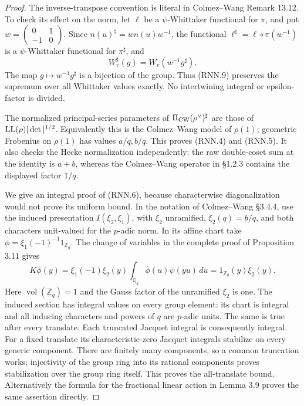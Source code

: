\begin{proof}
The inverse-transpose convention is literal in Colmez--Wang
Remark 13.12.  To check its effect on the norm, let \(\ell\) be a
\(\psi\)-Whittaker functional for \(\pi\), and put
\(w=\left(\begin{smallmatrix}0&1\\-1&0\end{smallmatrix}\right)\).
Since \(n(u)^\sharp=wn(u)w^{-1}\), the functional
\(\ell^\sharp=\ell\circ\pi(w^{-1})\) is a
\(\psi\)-Whittaker functional for \(\pi^\sharp\), and
\[
 W_v^\sharp(g)=W_v(w^{-1}g^\sharp).
 \tag{RNN.9}
\]
The map \(g\mapsto w^{-1}g^\sharp\) is a bijection of the group.
Thus (RNN.9) preserves the supremum over all Whittaker values
exactly.  No intertwining integral or epsilon-factor is divided.

The normalized principal-series parameters of
\(\Pi_{\rm CW}(\rho^\vee)^\sharp\) are those of
\({\rm LL}(\rho)|\det|^{1/2}\).  Equivalently this is the
Colmez--Wang model of \(\rho(1)\); geometric Frobenius on
\(\rho(1)\) has values \(a/q,b/q\).  This proves (RNN.4) and (RNN.5).
It also checks the Hecke normalization independently: the raw
double-coset sum at the identity is \(a+b\), whereas the
Colmez--Wang operator in \S1.2.3 contains the displayed factor
\(1/q\).

We give an integral proof of (RNN.6), because characterwise
diagonalization would not prove its uniform bound.
In the notation of Colmez--Wang \S3.4.4, use the induced
presentation \(I(\xi_2,\xi_1)\), with \(\xi_2\) unramified,
\(\xi_2(q)=b/q\), and both characters unit-valued for the
\(p\)-adic norm.  In its affine chart take
\(\bar\phi=\xi_1(-1)^{-1}1_{\mathbb Z_q}\).
The change of variables in the complete proof of Proposition 3.11
gives
\[
 K\bar\phi(y)
   =\xi_1(-1)\xi_2(y)
       \int_{\mathbb Q_q}\bar\phi(u)\psi(yu)\,du
   =1_{\mathbb Z_q}(y)\xi_2(y).
 \tag{RNN.10}
\]
Here \(\operatorname{vol}(\mathbb Z_q)=1\) and the Gauss factor
of the unramified \(\xi_2\) is one.
The induced section has integral values on every group element:
its chart is integral and all inducing characters and powers of
\(q\) are \(p\)-adic units.  The same is true after every translate.
Each truncated Jacquet integral is consequently integral.
For a fixed translate its characteristic-zero Jacquet integrals
stabilize on every generic component.  There are finitely many
components, so a common truncation works; injectivity of the
group ring into its rational components proves stabilization
over the group ring itself.  This proves the all-translate bound.
Alternatively the formula for the fractional linear action in
Lemma 3.9 proves the same assertion directly.


\end{proof}
